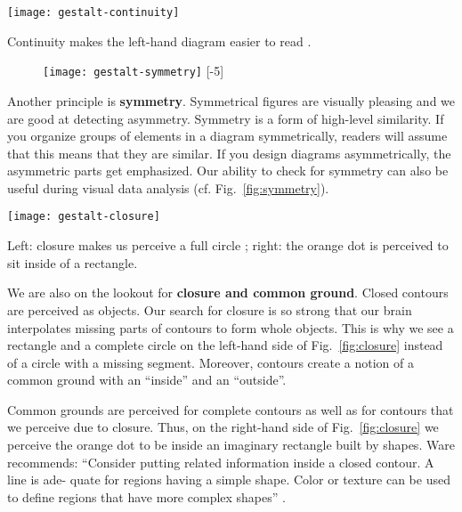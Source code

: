 \begin{marginfigure}
\centering
\texttt{[image: gestalt-continuity]}
\caption{\label{fig:continuity} Continuity makes the left-hand diagram easier to read \cite{Ware12}.}%
\end{marginfigure}

\begin{figure}
\centering
\texttt{[image: gestalt-symmetry]}
[-5\baselineskip]
\end{figure}

Another principle is \textbf{symmetry}. Symmetrical figures are visually pleasing and we are good at detecting asymmetry. Symmetry is a form of high-level similarity. If you organize groups of elements in a diagram symmetrically, readers will assume that this means that they are similar. If you design diagrams asymmetrically, the asymmetric parts get emphasized. Our ability to check for symmetry can also be useful during visual data analysis (cf. Fig.~\ref{fig:symmetry}).

\begin{marginfigure}
\centering
\texttt{[image: gestalt-closure]}
\caption{\label{fig:closure} Left: closure makes us perceive a full circle \cite{Ware12}; right: the orange dot is perceived to sit inside of a rectangle.}%
\end{marginfigure}

We are also on the lookout for \textbf{closure and common ground}. Closed contours are perceived as objects. Our search for closure is so strong that our brain interpolates missing parts of contours to form whole objects. This is why we see a rectangle and a complete circle on the left-hand side of Fig.~\ref{fig:closure} instead of a circle with a missing segment. Moreover, contours create a notion of a common ground with an ``inside'' and an ``outside''.

Common grounds are perceived for complete contours as well as for contours that we perceive due to closure. Thus, on the right-hand side of Fig.~\ref{fig:closure} we perceive the orange dot to be inside an imaginary rectangle built by shapes. Ware recommends: ``Consider putting related information inside a closed contour. A line is ade- quate for regions having a simple shape. Color or texture can be used to define regions that have more complex shapes'' \cite{Ware12}.


